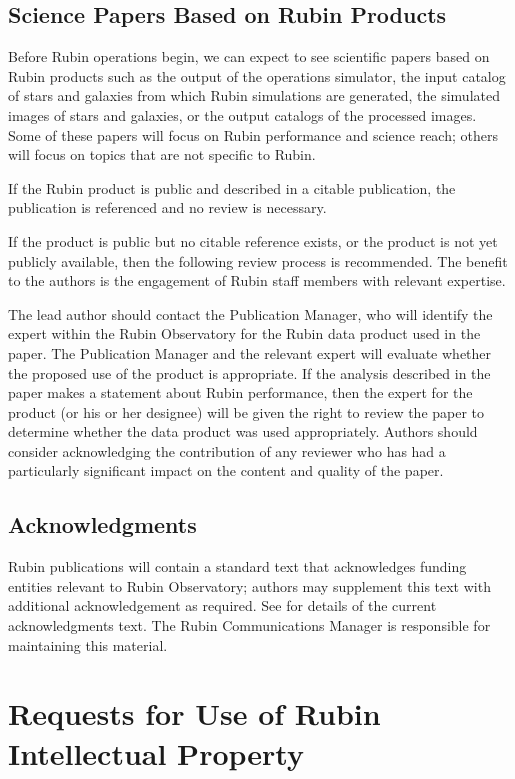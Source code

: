 \subsection{Science Papers Based on Rubin
Products}\label{science-papers-based-on-rubin-products}

Before Rubin operations begin, we can expect to see scientific papers based on Rubin products such as the output of the operations simulator, the input catalog of stars and galaxies from which Rubin simulations are generated, the simulated images of stars and galaxies, or the output catalogs of the processed images.
Some of these papers will focus on Rubin performance and science reach; others will focus on topics that are not specific to Rubin.

If the Rubin product is public and described in a citable publication, the publication is referenced and no review is necessary.

If the product is public but no citable reference exists, or the product is not yet publicly available, then the following review process is recommended.
The benefit to the authors is the engagement of Rubin staff members with relevant expertise.

The lead author should contact the Publication Manager, who will identify the expert within the Rubin Observatory for the Rubin data product used in the paper.
The Publication Manager and the relevant expert will evaluate whether the proposed use of the product is appropriate.
If the analysis described in the paper makes a statement about Rubin performance, then the expert for the product (or his or her designee) will be given the right to review the paper to determine whether the data product was used appropriately.
Authors should consider acknowledging the contribution of any reviewer who has had a particularly significant impact on the content and quality of the paper.

\subsection{Acknowledgments}

Rubin publications will contain a standard text that acknowledges funding entities relevant to Rubin Observatory; authors may supplement this text with additional acknowledgement as required.
See  for details of the current acknowledgments text.
The Rubin Communications Manager is responsible for maintaining this material.

\section{Requests for Use of Rubin Intellectual
Property}\label{requests-for-use-of-rubin-intellectual-property}

